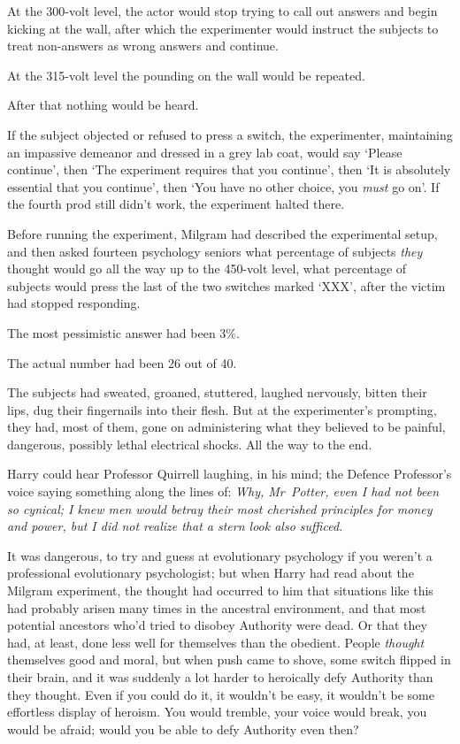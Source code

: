 At the 300-volt level, the actor would stop trying to call out answers and begin kicking at the wall, after which the experimenter would instruct the subjects to treat non-answers as wrong answers and continue.

At the 315-volt level the pounding on the wall would be repeated.

After that nothing would be heard.

If the subject objected or refused to press a switch, the experimenter, maintaining an impassive demeanor and dressed in a grey lab coat, would say ‘Please continue’, then ‘The experiment requires that you continue’, then ‘It is absolutely essential that you continue’, then ‘You have no other choice, you \emph{must} go on’. If the fourth prod still didn’t work, the experiment halted there.

Before running the experiment, Milgram had described the experimental setup, and then asked fourteen psychology seniors what percentage of subjects \emph{they} thought would go all the way up to the 450-volt level, what percentage of subjects would press the last of the two switches marked ‘XXX’, after the victim had stopped responding.

The most pessimistic answer had been 3\%.

The actual number had been 26 out of 40.

The subjects had sweated, groaned, stuttered, laughed nervously, bitten their lips, dug their fingernails into their flesh. But at the experimenter’s prompting, they had, most of them, gone on administering what they believed to be painful, dangerous, possibly lethal electrical shocks. All the way to the end.

Harry could hear Professor Quirrell laughing, in his mind; the Defence Professor’s voice saying something along the lines of: \emph{Why, Mr~Potter, even I had not been so cynical; I knew men would betray their most cherished principles for money and power, but I did not realize that a stern look also sufficed.}

It was dangerous, to try and guess at evolutionary psychology if you weren’t a professional evolutionary psychologist; but when Harry had read about the Milgram experiment, the thought had occurred to him that situations like this had probably arisen many times in the ancestral environment, and that most potential ancestors who’d tried to disobey Authority were dead. Or that they had, at least, done less well for themselves than the obedient. People \emph{thought} themselves good and moral, but when push came to shove, some switch flipped in their brain, and it was suddenly a lot harder to heroically defy Authority than they thought. Even if you could do it, it wouldn’t be easy, it wouldn’t be some effortless display of heroism. You would tremble, your voice would break, you would be afraid; would you be able to defy Authority even then?

